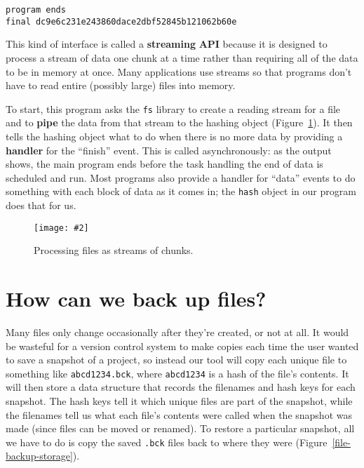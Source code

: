 \documentclass[krantzl]{krantz}
\newcommand{\figpdf}[4]{\begin{figure}%
\centering%
\texttt{[image: \#2]}%
\caption{#3}%
\label{#1}%
\end{figure}}
\newcommand{\figref}[1]{Figure~\ref{#1}}
\newcommand{\glossref}[1]{\textbf{#1}}
\begin{document}
\begin{lstlisting}[frame=tblr,backgroundcolor=\color{black!5}]
program ends
final dc9e6c231e243860dace2dbf52845b121062b60e
\end{lstlisting}



\noindent This kind of interface is called
a \glossref{streaming} \glossref{API}
because it is designed to process a stream of data one chunk at a time
rather than requiring all of the data to be in memory at once.
Many applications use streams
so that programs don’t have to read entire (possibly large) files into memory.


To start,
this program asks the \texttt{fs} library to create a reading stream for a file
and to \glossref{pipe} the data from that stream to the hashing object
(\figref{file-backup-streaming}).
It then tells the hashing object what to do when there is no more data
by providing a \glossref{handler} for the “finish” event.
This is called asynchronously:
as the output shows,
the main program ends before the task handling the end of data is scheduled and run.
Most programs also provide a handler for “data” events to do something with each block of data as it comes in;
the \texttt{hash} object in our program does that for us.

\figpdf{file-backup-streaming}{./file-backup/streaming.pdf}{Processing files as streams of chunks.}{0.6}

\section{How can we back up files?}\label{file-backup-backup}


Many files only change occasionally after they’re created, or not at all.
It would be wasteful for a version control system to make copies
each time the user wanted to save a snapshot of a project,
so instead our tool will copy each unique file to something like \texttt{abcd1234.bck},
where \texttt{abcd1234} is a hash of the file’s contents.
It will then store a data structure that records the filenames and hash keys for each snapshot.
The hash keys tell it which unique files are part of the snapshot,
while the filenames tell us what each file’s contents were called when the snapshot was made
(since files can be moved or renamed).
To restore a particular snapshot,
all we have to do is copy the saved \texttt{.bck} files back to where they were
(\figref{file-backup-storage}).
\end{document}
